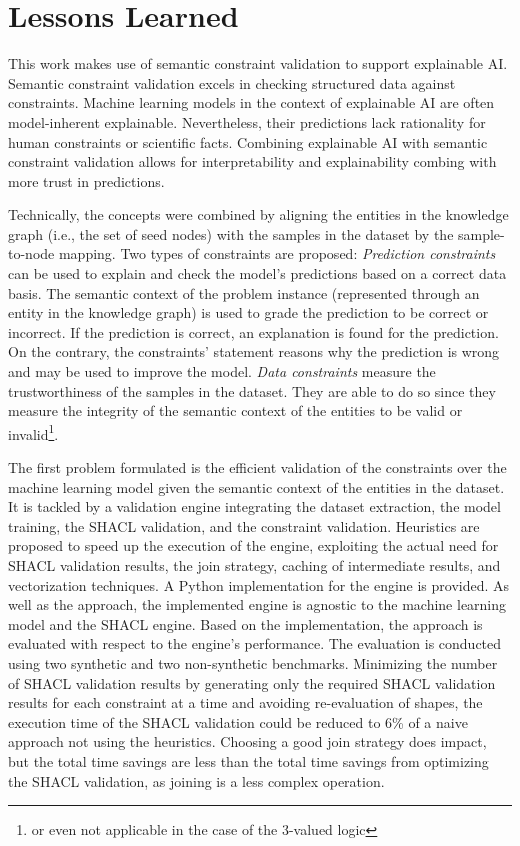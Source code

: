\section{Lessons Learned}
This work makes use of semantic constraint validation to support explainable AI. Semantic constraint validation excels in checking structured data against constraints. Machine learning models in the context of explainable AI are often model-inherent explainable. Nevertheless, their predictions lack rationality for human constraints or scientific facts. Combining explainable AI with semantic constraint validation allows for interpretability and explainability combing with more trust in predictions.

Technically, the concepts were combined by aligning the entities in the knowledge graph (i.e., the set of seed nodes) with the samples in the dataset by the sample-to-node mapping. Two types of constraints are proposed: \emph{Prediction constraints} can be used to explain and check the model's predictions based on a correct data basis. The semantic context of the problem instance (represented through an entity in the knowledge graph) is used to grade the prediction to be correct or incorrect. If the prediction is correct, an explanation is found for the prediction. On the contrary, the constraints' statement reasons why the prediction is wrong and may be used to improve the model. \emph{Data constraints} measure the trustworthiness of the samples in the dataset. They are able to do so since they measure the integrity of the semantic context of the entities to be valid or invalid\footnote{or even not applicable in the case of the 3-valued logic}.

The first problem formulated is the efficient validation of the constraints over the machine learning model given the semantic context of the entities in the dataset. It is tackled by a validation engine integrating the dataset extraction, the model training, the SHACL validation, and the constraint validation. Heuristics are proposed to speed up the execution of the engine, exploiting the actual need for SHACL validation results, the join strategy, caching of intermediate results, and vectorization techniques. A Python implementation for the engine is provided. As well as the approach, the implemented engine is agnostic to the machine learning model and the SHACL engine. Based on the implementation, the approach is evaluated with respect to the engine's performance.
The evaluation is conducted using two synthetic and two non-synthetic benchmarks. Minimizing the number of SHACL validation results by generating only the required SHACL validation results for each constraint at a time and avoiding re-evaluation of shapes, the execution time of the SHACL validation could be reduced to 6\% of a naive approach not using the heuristics. Choosing a good join strategy does impact, but the total time savings are less than the total time savings from optimizing the SHACL validation, as joining is a less complex operation. 

